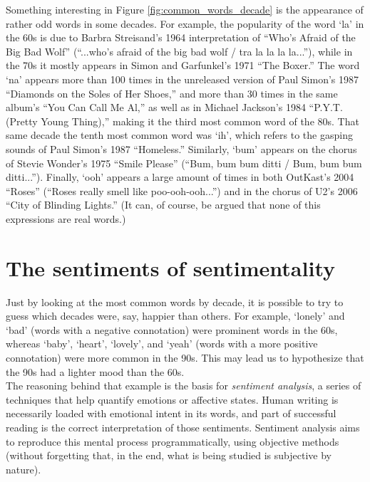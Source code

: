 \documentclass{article}
\newenvironment{aside}
  {\begin{mdframed}[style=0,%
      leftline=false,rightline=false,leftmargin=2em,rightmargin=2em,%
          innerleftmargin=0pt,innerrightmargin=0pt,linewidth=0.75pt,%
      skipabove=7pt,skipbelow=7pt]\small}
  {\end{mdframed}}
\begin{document}
\FloatBarrier


\begin{aside}
        Something interesting in Figure \ref{fig:common_words_decade} is the appearance of rather odd words in some decades. For example, the popularity of the word `la' in the 60s is due to Barbra Streisand's 1964 interpretation of ``Who's Afraid of the Big Bad Wolf'' (``...who's afraid of the big bad wolf / tra la la la la...''), while in the 70s it mostly appears in Simon and Garfunkel's 1971 ``The Boxer.'' The word `na' appears more than 100 times in the unreleased version of Paul Simon's 1987 ``Diamonds on the Soles of Her Shoes,'' and more than 30 times in the same album's ``You Can Call Me Al,'' as well as in Michael Jackson's 1984 ``P.Y.T. (Pretty Young Thing),'' making it the third most common word of the 80s. That same decade the tenth most common word was `ih', which refers to the gasping sounds of Paul Simon's 1987 ``Homeless.'' Similarly, `bum' appears on the chorus of Stevie Wonder's 1975 ``Smile Please'' (``Bum, bum bum ditti / Bum, bum bum ditti...''). Finally, `ooh' appears a large amount of times in both OutKast's 2004 ``Roses'' (``Roses really smell like poo-ooh-ooh...'') and in the chorus of U2's 2006 ``City of Blinding Lights.'' (It can, of course, be argued that none of this expressions are real words.)
\end{aside}





\section*{The sentiments of sentimentality}


Just by looking at the most common words by decade, it is possible to try to guess which decades were, say, happier than others. For example, `lonely' and `bad' (words with a negative connotation) were prominent words in the 60s, whereas `baby', `heart', `lovely', and `yeah' (words with a more positive connotation) were more common in the 90s. This may lead us to hypothesize that the 90s had a lighter mood than the 60s. \\


The reasoning behind that example is the basis for \textit{sentiment analysis}, a series of techniques that help quantify emotions or affective states. Human writing is necessarily loaded with emotional intent in its words, and part of successful reading is the correct interpretation of those sentiments. Sentiment analysis aims to reproduce this mental process programmatically, using objective methods (without forgetting that, in the end, what is being studied is subjective by nature). \\
\end{document}
